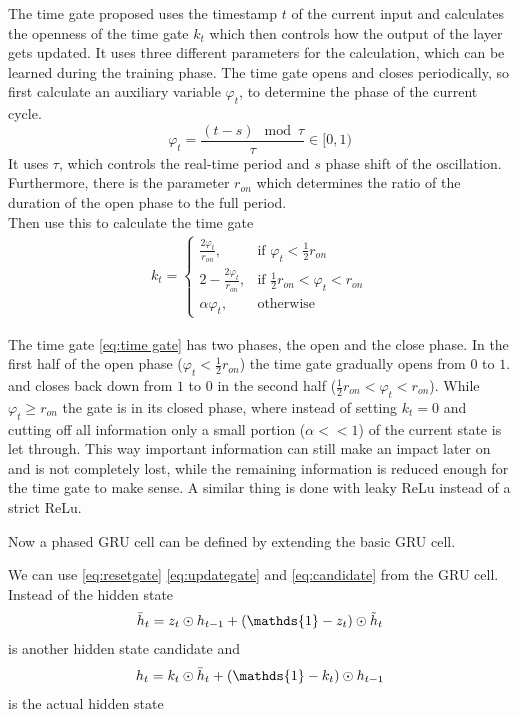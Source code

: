 \begin{definition}  The time gate \cite{neil-2016} proposed uses the timestamp $t$ of the current input and calculates the openness of the time gate $k_t$ which then controls how the output of the layer gets updated. 
It uses three different parameters for the calculation, which can be learned during the training phase. 
The time gate opens and closes periodically, so first calculate an auxiliary variable $\varphi_t$, to determine the phase of the current cycle.
 $$\varphi_t=\frac{(t-s) \mod \tau}{\tau} \in [0,1)$$
It uses $\tau$, which controls the real-time period and $s$ phase shift of the oscillation.
Furthermore, there is the parameter $r_{on}$ which determines the ratio of the duration of the open phase to the full period.\\    
Then use this to calculate the time gate
\begin{align}
    k_t= \begin{cases} \frac{2\varphi_t}{r_{on}}, & \text{if } \varphi_t< \frac{1}{2} r_{on}\\
    2- \frac{2\varphi_t}{r_{on}}, & \text{if }  \frac{1}{2} r_{on} < \varphi_t < r_{on}\\
    \alpha\varphi_t, &\text{otherwise} \end{cases}
    \label{eq:time gate}
\end{align}
\end{definition}

\begin{explanation}
The time gate \ref{eq:time gate} has two phases, the open and the close phase.
In the first half of the open phase ($\varphi_t<\frac{1}{2}r_{on}$) the time gate gradually opens from $0$ to $1$. and closes back down from $1$ to $0$ in the second half ($\frac{1}{2} r_{on} < \varphi_t < r_{on}$).
While $\varphi_t \geq r_{on}$ the gate is in its closed phase, where instead of setting $k_t = 0$ and cutting off all information only a small portion ($\alpha<<1$) of the current state is let through. This way important information can still make an impact later on and is not completely lost, while the remaining information is reduced enough for the time gate to make sense. 
A similar thing is done with leaky ReLu instead of a strict ReLu.
\end{explanation}


Now a phased GRU cell can be defined by extending the basic GRU cell.
\begin{definition}
    We can use \ref{eq:resetgate} \ref{eq:updategate} and \ref{eq:candidate}  from the GRU cell.
    Instead of the hidden state
    \begin{align}
        \Bar{h}_t= z_t\odot h_{t-1} +(\mathds{1}-z_t)\odot \Tilde{h}_t
    \end{align}
    is another hidden state candidate and 
    \begin{align}
        h_t =  k_t \odot\Bar{h}_t + (\mathds{1}-k_t)\odot h_{t-1}
    \end{align}
    is the actual hidden state 
\end{definition}

